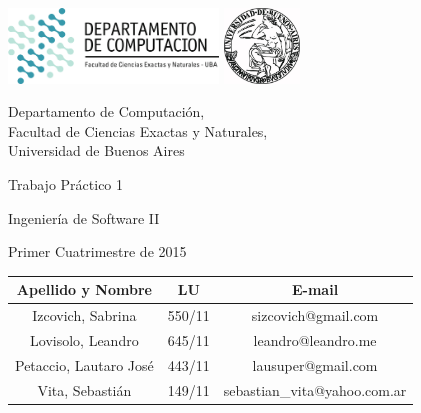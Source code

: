 \documentclass[a4paper, 10pt, twoside]{article}
\newcommand{\titulo}{Trabajo Práctico 1}
\newcommand{\materia}{Ingeniería de Software II}
\newcommand{\cuatrimestre}{Primer Cuatrimestre de 2015}
\begin{document}


\thispagestyle{caratula}

\begin{center}

\includegraphics[height=2cm]{DC.png} 
\hfill
\includegraphics[height=2cm]{UBA.jpg} 

\vspace{2cm}

Departamento de Computación,\\
Facultad de Ciencias Exactas y Naturales,\\
Universidad de Buenos Aires

\vspace{4cm}

\begin{Huge}
\titulo
\end{Huge}

\vspace{0.5cm}

\begin{Large}
\materia
\end{Large}

\vspace{1cm}

\cuatrimestre

\vspace{4cm}

\begin{tabular}{|c|c|c|}
\hline
Apellido y Nombre & LU & E-mail\\
\hline
Izcovich, Sabrina      & 550/11 & sizcovich@gmail.com\\
Lovisolo, Leandro      & 645/11 & leandro@leandro.me\\
Petaccio, Lautaro José & 443/11 & lausuper@gmail.com\\
Vita, Sebastián        & 149/11 & sebastian\_vita@yahoo.com.ar\\
\hline
\end{tabular}

\end{center}
\end{document}
